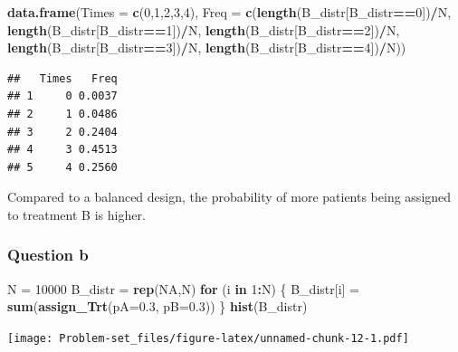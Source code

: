 \documentclass[]{article}
\newenvironment{Shaded}{\begin{snugshade}}{\end{snugshade}}
\newcommand{\ControlFlowTok}[1]{\textcolor[rgb]{0.13,0.29,0.53}{\textbf{#1}}}
\newcommand{\DataTypeTok}[1]{\textcolor[rgb]{0.13,0.29,0.53}{#1}}
\newcommand{\DecValTok}[1]{\textcolor[rgb]{0.00,0.00,0.81}{#1}}
\newcommand{\FloatTok}[1]{\textcolor[rgb]{0.00,0.00,0.81}{#1}}
\newcommand{\KeywordTok}[1]{\textcolor[rgb]{0.13,0.29,0.53}{\textbf{#1}}}
\newcommand{\NormalTok}[1]{#1}
\newcommand{\OperatorTok}[1]{\textcolor[rgb]{0.81,0.36,0.00}{\textbf{#1}}}
\newcommand{\OtherTok}[1]{\textcolor[rgb]{0.56,0.35,0.01}{#1}}
\newcommand{\StringTok}[1]{\textcolor[rgb]{0.31,0.60,0.02}{#1}}
\begin{document}
\begin{Shaded}
\begin{Highlighting}[]
\KeywordTok{data.frame}\NormalTok{(}\DataTypeTok{Times =} \KeywordTok{c}\NormalTok{(}\DecValTok{0}\NormalTok{,}\DecValTok{1}\NormalTok{,}\DecValTok{2}\NormalTok{,}\DecValTok{3}\NormalTok{,}\DecValTok{4}\NormalTok{), }\DataTypeTok{Freq =} \KeywordTok{c}\NormalTok{(}\KeywordTok{length}\NormalTok{(B_distr[B_distr}\OperatorTok{==}\DecValTok{0}\NormalTok{])}\OperatorTok{/}\NormalTok{N, }\KeywordTok{length}\NormalTok{(B_distr[B_distr}\OperatorTok{==}\DecValTok{1}\NormalTok{])}\OperatorTok{/}\NormalTok{N, }\KeywordTok{length}\NormalTok{(B_distr[B_distr}\OperatorTok{==}\DecValTok{2}\NormalTok{])}\OperatorTok{/}\NormalTok{N, }\KeywordTok{length}\NormalTok{(B_distr[B_distr}\OperatorTok{==}\DecValTok{3}\NormalTok{])}\OperatorTok{/}\NormalTok{N, }\KeywordTok{length}\NormalTok{(B_distr[B_distr}\OperatorTok{==}\DecValTok{4}\NormalTok{])}\OperatorTok{/}\NormalTok{N))}
\end{Highlighting}
\end{Shaded}

\begin{verbatim}
##   Times   Freq
## 1     0 0.0037
## 2     1 0.0486
## 3     2 0.2404
## 4     3 0.4513
## 5     4 0.2560
\end{verbatim}

Compared to a balanced design, the probability of more patients being
assigned to treatment B is higher.

\hypertarget{question-b-5}{%
\subsubsection{Question b}\label{question-b-5}}

\begin{Shaded}
\begin{Highlighting}[]
\NormalTok{N =}\StringTok{ }\DecValTok{10000}
\NormalTok{B_distr =}\StringTok{ }\KeywordTok{rep}\NormalTok{(}\OtherTok{NA}\NormalTok{,N)}
\ControlFlowTok{for}\NormalTok{ (i }\ControlFlowTok{in} \DecValTok{1}\OperatorTok{:}\NormalTok{N) \{}
\NormalTok{  B_distr[i] =}\StringTok{ }\KeywordTok{sum}\NormalTok{(}\KeywordTok{assign_Trt}\NormalTok{(}\DataTypeTok{pA=}\FloatTok{0.3}\NormalTok{, }\DataTypeTok{pB=}\FloatTok{0.3}\NormalTok{))}
\NormalTok{\}}
\KeywordTok{hist}\NormalTok{(B_distr)}
\end{Highlighting}
\end{Shaded}

\texttt{[image: Problem-set\_files/figure-latex/unnamed-chunk-12-1.pdf]}
\end{document}
